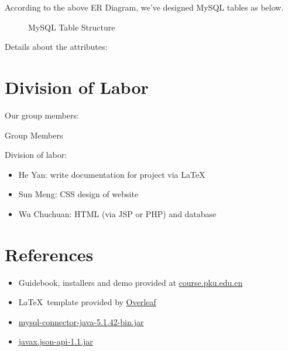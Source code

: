 According to the above ER Diagram, we've designed MySQL tables as below.

\begin{figure}[htbp]
\begin{center}

\end{center}
\caption{MySQL Table Structure}
\end{figure}

Details about the attributes:



\section{Division of Labor}

Our group members:

\begin{table}[htbp]
	\begin{center}
		
	\end{center}
	\caption{Group Members}
\end{table}

Division of labor:

\begin{itemize}
	\item He Yan: write documentation for project via \LaTeX
	\item Sun Meng: CSS design of website
	\item Wu Chuchuan: HTML (via JSP or PHP) and database
\end{itemize}

\section{References}

\begin{itemize}
	\item Guidebook, installers and demo provided at \url{course.pku.edu.cn}
	\item \LaTeX \, template provided by \href{https://www.overleaf.com/latex/templates/project-template-titlepage/bwmhgfdvvhpw}{Overleaf}
	\item \href{https://dev.mysql.com/downloads/connector/j/}{mysql-connector-java-5.1.42-bin.jar}
	\item \href{https://mvnrepository.com/artifact/javax.json/javax.json-api/1.1}{javax.json-api-1.1.jar}
\end{itemize}



